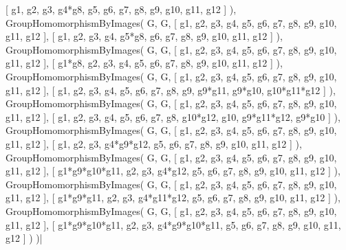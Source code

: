     [ g1, g2, g3, g4*g8, g5, g6, g7, g8, g9, g10, g11, g12 
     ] ), GroupHomomorphismByImages( G, G, 
    [ g1, g2, g3, g4, g5, g6, g7, g8, g9, g10, g11, g12 ], 
    [ g1, g2, g3, g4, g5*g8, g6, g7, g8, g9, g10, g11, g12 
     ] ), GroupHomomorphismByImages( G, G, 
    [ g1, g2, g3, g4, g5, g6, g7, g8, g9, g10, g11, g12 ], 
    [ g1*g8, g2, g3, g4, g5, g6, g7, g8, g9, g10, g11, g12 
     ] ), GroupHomomorphismByImages( G, G, 
    [ g1, g2, g3, g4, g5, g6, g7, g8, g9, g10, g11, g12 ], 
    [ g1, g2, g3, g4, g5, g6, g7, g8, g9, g9*g11, g9*g10, g10*g11*g12 
     ] ), GroupHomomorphismByImages( G, G, 
    [ g1, g2, g3, g4, g5, g6, g7, g8, g9, g10, g11, g12 ], 
    [ g1, g2, g3, g4, g5, g6, g7, g8, g10*g12, g10, g9*g11*g12, g9*g10 
     ] ), GroupHomomorphismByImages( G, G, 
    [ g1, g2, g3, g4, g5, g6, g7, g8, g9, g10, g11, g12 ], 
    [ g1, g2, g3, g4*g9*g12, g5, g6, g7, g8, g9, g10, g11, g12 
     ] ), GroupHomomorphismByImages( G, G, 
    [ g1, g2, g3, g4, g5, g6, g7, g8, g9, g10, g11, g12 ], 
    [ g1*g9*g10*g11, g2, g3, g4*g12, g5, g6, g7, g8, g9, g10, g11, g12 
     ] ), GroupHomomorphismByImages( G, G, 
    [ g1, g2, g3, g4, g5, g6, g7, g8, g9, g10, g11, g12 ], 
    [ g1*g9*g11, g2, g3, g4*g11*g12, g5, g6, g7, g8, g9, g10, g11, g12 
     ] ), GroupHomomorphismByImages( G, G, 
    [ g1, g2, g3, g4, g5, g6, g7, g8, g9, g10, g11, g12 ], 
    [ g1*g9*g10*g11, g2, g3, g4*g9*g10*g11, g5, g6, g7, g8, g9, g10, g11, 
      g12 ] ) )|

